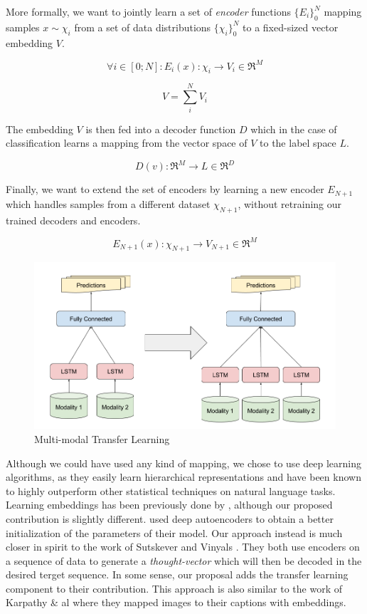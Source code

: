 \documentclass[12pt]{article}
\begin{document}
More formally, we want to jointly learn a set of \emph{encoder}
functions $\{E_i\}_0^N$ mapping samples $x \sim \chi_i$ from a set of
data distributions $\{\chi_i\}_0^N$ to a fixed-sized vector embedding
$V$.

\[ \forall i \in [0; N]: E_i(x): \chi_i \rightarrow V_i \in \Re^M\]

\[V = \sum_i^N V_i\]

The embedding $V$ is then fed into a decoder function $D$ which in the
case of classification learns a mapping from the vector space of $V$ to
the label space $L$.

\[ D(v): \Re^M \rightarrow L \in \Re^D\]

Finally, we want to extend the set of encoders by learning a new encoder
$E_{N+1}$ which handles samples from a different dataset $\chi_{N+1}$,
without retraining our trained decoders and encoders.

\[ E_{N+1}(x): \chi_{N+1} \rightarrow V_{N+1} \in \Re^M\]

\begin{figure}[htbp]
\centering
\includegraphics{figures/multimodal.png}
\caption{Multi-modal Transfer Learning}
\end{figure}

Although we could have used any kind of mapping, we chose to use deep
learning algorithms, as they easily learn hierarchical representations
and have been known to highly outperform other statistical techniques on
natural language tasks. Learning embeddings has been previously done by
\cite{zhuang2015supervised}, although our proposed contribution is
slightly different. \cite{zhuang2015supervised} used deep autoencoders to
obtain a better initialization of the parameters of their model. Our
approach instead is much closer in spirit to the work of Sutskever
\cite{sutskever2014sequence} and Vinyals \cite{vinyals2015grammar}. They
both use encoders on a sequence of data to generate a
\emph{thought-vector} which will then be decoded in the desired terget
sequence. In some sense, our proposal adds the transfer learning
component to their contribution. This approach is also similar to the
work of Karpathy \& al \cite{karpathy2014deep} where they mapped
images to their captions with embeddings.
\end{document}
